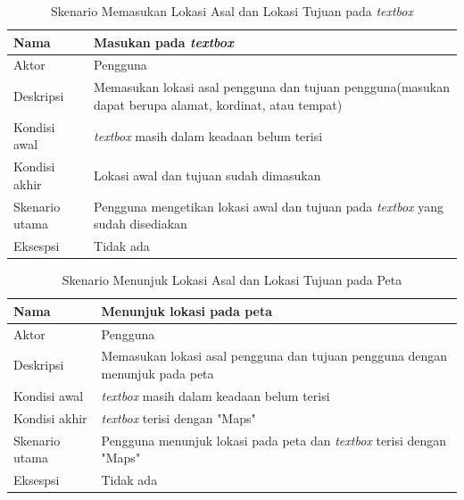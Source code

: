 \begin{table}[H]
	\centering
		\begin{tabular}{ |p{2cm}|p{10cm}| }
			\hline
			Nama &  Masukan pada \textit{textbox}\\ \hline
			Aktor & Pengguna  \\ \hline
			Deskripsi & Memasukan lokasi asal pengguna dan tujuan pengguna(masukan dapat berupa alamat, kordinat, atau tempat) \\ \hline
			Kondisi awal & \textit{textbox} masih dalam keadaan belum terisi \\ \hline
			Kondisi akhir & Lokasi awal dan tujuan sudah dimasukan   \\ \hline
			Skenario utama & Pengguna mengetikan lokasi awal dan tujuan pada \textit{textbox} yang sudah disediakan \\ \hline
			Eksespsi & Tidak ada  \\ 
			\hline
		\end{tabular}
	\caption{Skenario Memasukan Lokasi Asal dan Lokasi Tujuan pada \textit{textbox}}
	\label{tab:masukanLokasi}
\end{table}

\begin{table}[H]
	\centering
		\begin{tabular}{ |p{2cm}|p{10cm}| }
			\hline
			Nama &  Menunjuk lokasi pada peta\\ \hline
			Aktor & Pengguna  \\ \hline
			Deskripsi & Memasukan lokasi asal pengguna dan tujuan pengguna dengan menunjuk pada peta \\ \hline
			Kondisi awal & \textit{textbox} masih dalam keadaan belum terisi \\ \hline
			Kondisi akhir & \textit{textbox} terisi dengan "Maps"   \\ \hline
			Skenario utama & Pengguna menunjuk lokasi pada peta dan \textit{textbox} terisi dengan "Maps" \\ \hline
			Eksespsi & Tidak ada  \\ 
			\hline
		\end{tabular}
	\caption{Skenario Menunjuk Lokasi Asal dan Lokasi Tujuan pada Peta}
	\label{tab:lokasiPeta}
\end{table}

